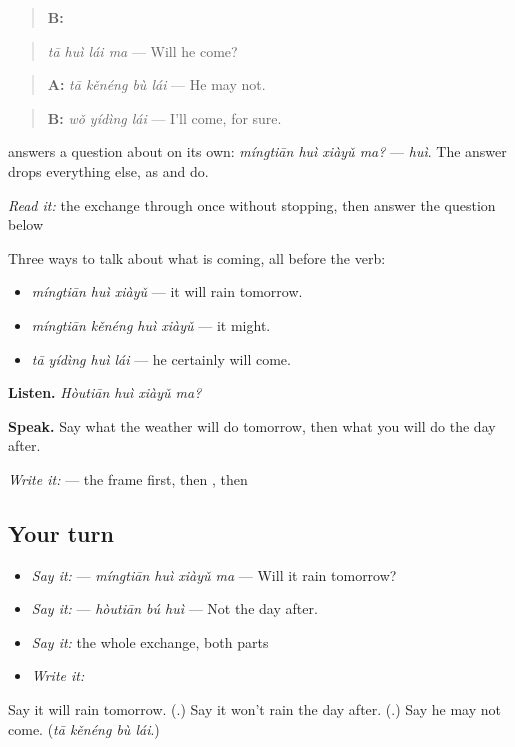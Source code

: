 \begin{quote}
\textbf{B:} 
\end{quote}

\begin{quote}
\emph{tā huì lái ma} — Will he come?
\end{quote}

\begin{quote}
\textbf{A:} \emph{tā kěnéng bù lái} — He may not.
\end{quote}

\begin{quote}
\textbf{B:} \emph{wǒ yídìng lái} — I'll come, for sure.
\end{quote}

 answers a question about  on its own: \emph{míngtiān huì xiàyǔ ma?} — \emph{huì}. The answer drops everything else, as  and  do.

\begin{tcolorbox}[breakable,skin=enhanced,colback=orange!6,colframe=orange!45!black,boxrule=0.5pt,arc=1mm,left=6pt,right=6pt,top=4pt,bottom=4pt,fonttitle=\bfseries,title={Read this}]
\emph{Read it:} the exchange through once without stopping, then answer the question below
\end{tcolorbox}

\begin{grammarlens}[title={What you've built — a forecast, a chance, a certainty}]
Three ways to talk about what is coming, all before the verb:

\begin{itemize}
\raggedright
  \item \textbf{} \emph{míngtiān huì xiàyǔ} — it will rain tomorrow.
  \item \emph{míngtiān kěnéng huì xiàyǔ} — it might.
  \item \emph{tā yídìng huì lái} — he certainly will come.
\end{itemize}

\textbf{Listen.} \emph{Hòutiān huì xiàyǔ ma?}

\textbf{Speak.} Say what the weather will do tomorrow, then what you will do the day after.

\emph{Write it:}  — the frame first, then , then 
\end{grammarlens}

\subsection*{Your turn}
\begin{itemize}
\raggedright
  \item \emph{Say it:}  — \emph{míngtiān huì xiàyǔ ma} — Will it rain tomorrow?
  \item \emph{Say it:}  — \emph{hòutiān bú huì} — Not the day after.
  \item \emph{Say it:} the whole exchange, both parts
  \item \emph{Write it:} 
\end{itemize}

\begin{tcolorbox}[breakable,colback=teal!4,colframe=teal!35!black,title={Before you move on}]
Say it will rain tomorrow. (\textbf{}.) Say it won't rain the day after. (\textbf{}.) Say he may not come. (\emph{tā kěnéng bù lái}.)
\end{tcolorbox}
